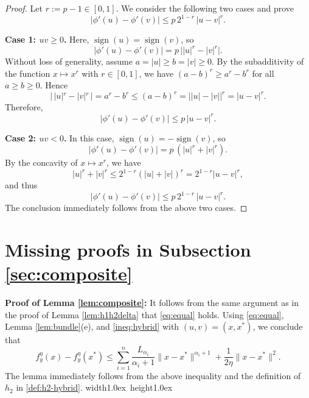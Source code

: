 \documentclass[11pt,letterpaper]{article}
\newcommand*{\QEDA}{\hfill\hbox{\vrule width1.0ex height1.0ex}}
\newcommand{\vgap}{\vspace{.1in}}
\begin{document}
\begin{proof}
Let $r := p-1 \in [0,1]$.
We consider the following two cases and prove
\[
|\phi'(u)-\phi'(v)| \le p\,2^{1-r}\,|u-v|^{r}.
\]

\medskip
\noindent\textbf{Case 1: $u v \ge 0$.}
Here, $\operatorname{sign}(u)=\operatorname{sign}(v)$, so
\[
|\phi'(u)-\phi'(v)|
= p\,\big||u|^{r}-|v|^{r}\big|.
\]
Without loss of generality, assume $a=|u|\ge b=|v|\ge 0$.
By the subadditivity of the function $x \mapsto x^{r}$ with $r\in [0,1]$, we have $(a-b)^{r} \ge a^{r} - b^{r}$ for all $a\ge b\ge 0$.
Hence
\[
|\,|u|^{r}-|v|^{r}\,|
= a^{r}-b^{r}
\le (a-b)^{r}
= \big||u|-|v|\big|^{r}
= |u-v|^{r}.
\]
Therefore,
\[
|\phi'(u)-\phi'(v)| \le p\,|u-v|^{r}.
\]

\medskip
\noindent\textbf{Case 2: $u v < 0$.}
In this case, $\operatorname{sign}(u)=-\operatorname{sign}(v)$, so
\[
|\phi'(u)-\phi'(v)| = p\,(|u|^{r}+|v|^{r}).
\]
By the concavity of $x\mapsto x^{r}$, we have
\[
|u|^{r} + |v|^{r} \le 2^{1-r} (|u|+|v|)^{r}
= 2^{1-r} |u - v|^{r},
\]
and thus
\[
|\phi'(u)-\phi'(v)| \le p\,2^{1-r}\,|u-v|^{r}.
\]
The conclusion immediately follows from the above two cases.
\end{proof}


\section{Missing proofs in Subsection \ref{sec:composite}}\label{sec:proofs}

\noindent
{\bf Proof of Lemma \ref{lem:composite}:}
It follows from the same argument as in the proof of Lemma \ref{lem:h1h2delta} that \eqref{eq:equal} holds. Using \eqref{eq:equal}, Lemma \ref{lem:bundle}(e), and \eqref{ineq:hybrid} with $(u,v)=(x,x^*)$, we conclude that 
\[
f_y^\eta(x) - f_y^\eta(x^*) \le \sum_{i=1}^n \frac{L_{\alpha_i}}{\alpha_i+1} \|x-x^*\|^{\alpha_i+1} + \frac{1}{2\eta}\|x-x^*\|^2.
\]
The lemma immediately follows from the above inequality and the definition of $h_2$ in \eqref{def:h2-hybrid}.
\QEDA

\vgap
\end{document}
